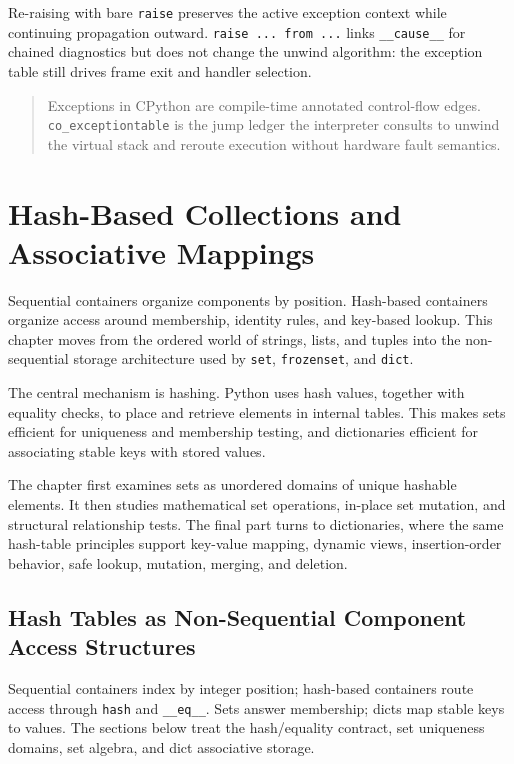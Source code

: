 \documentclass[a4paper,twoside]{report}
\begin{document}
Re-raising with bare \texttt{raise} preserves the active exception context while continuing propagation outward. \texttt{raise ... from ...} links \texttt{\_\_cause\_\_} for chained diagnostics but does not change the unwind algorithm: the exception table still drives frame exit and handler selection.

\begin{quote}
Exceptions in CPython are compile-time annotated control-flow edges. \texttt{co\_exceptiontable} is the jump ledger the interpreter consults to unwind the virtual stack and reroute execution without hardware fault semantics.
\end{quote}


\chapter{Hash-Based Collections and Associative Mappings}

Sequential containers organize components by position. Hash-based containers organize access around membership, identity rules, and key-based lookup. This chapter moves from the ordered world of strings, lists, and tuples into the non-sequential storage architecture used by \texttt{set}, \texttt{frozenset}, and \texttt{dict}.

The central mechanism is hashing. Python uses hash values, together with equality checks, to place and retrieve elements in internal tables. This makes sets efficient for uniqueness and membership testing, and dictionaries efficient for associating stable keys with stored values.

The chapter first examines sets as unordered domains of unique hashable elements. It then studies mathematical set operations, in-place set mutation, and structural relationship tests. The final part turns to dictionaries, where the same hash-table principles support key-value mapping, dynamic views, insertion-order behavior, safe lookup, mutation, merging, and deletion.

\section{Hash Tables as Non-Sequential Component Access Structures}

Sequential containers index by integer position; hash-based containers route access through \texttt{hash} and \texttt{\_\_eq\_\_}. Sets answer membership; dicts map stable keys to values. The sections below treat the hash/equality contract, set uniqueness domains, set algebra, and dict associative storage.
\end{document}
